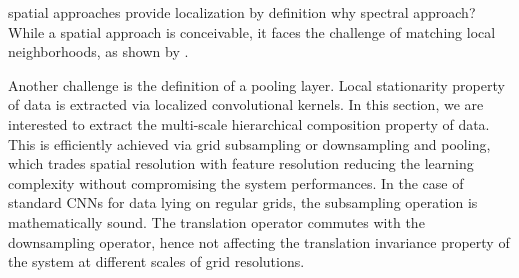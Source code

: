 \documentclass{article}
\newcommand{\bO}{\mathcal{O}}
\newcommand{\todo}[1]{{\color{red} #1 }}
\begin{document}

\todo{spatial approaches provide localization by definition}
\todo{why spectral approach?}
While a spatial approach is conceivable, it faces the challenge of matching
local neighborhoods, as shown by \cite{art:BrunaZarembaSzlamLeCun13DLgraphs}.

\todo{Another challenge is the definition of a pooling layer.}
Local stationarity property of data is extracted via localized convolutional
kernels. In this section, we are interested to extract the multi-scale
hierarchical composition property of data. This is efficiently achieved via grid
subsampling or downsampling and pooling, which trades spatial resolution with
feature resolution reducing the learning complexity without compromising the
system performances. In the case of standard CNNs for data lying on regular
grids, the subsampling operation is mathematically sound. The translation
operator commutes with the downsampling operator, hence not affecting the
translation invariance property of the system at different scales of grid
resolutions.
\end{document}
